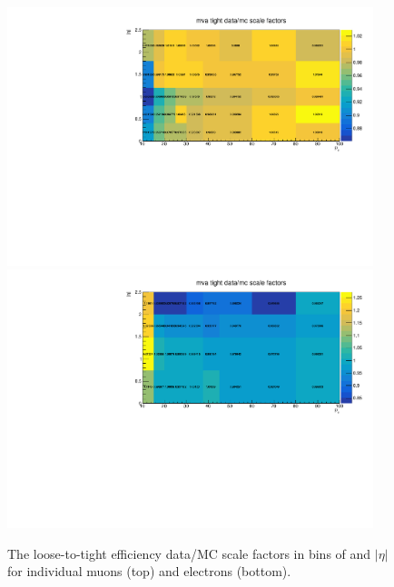 \begin{figure}[hbtp]
 \begin{center}
   \includegraphics[width=0.95\textwidth]{ch4_figs/tight_mu_lepEff_SF.pdf}
   \includegraphics[width=0.95\textwidth]{ch4_figs/tight_ele_lepEff_SF.pdf}
   \caption[Lepton selection efficiency Data/MC scale factors]{The loose-to-tight efficiency data/MC scale factors in bins of \pt and $|\eta|$ for individual muons (top) and electrons (bottom).}
   \label{fig:tightLepEff}
   \end{center}
\end{figure}



